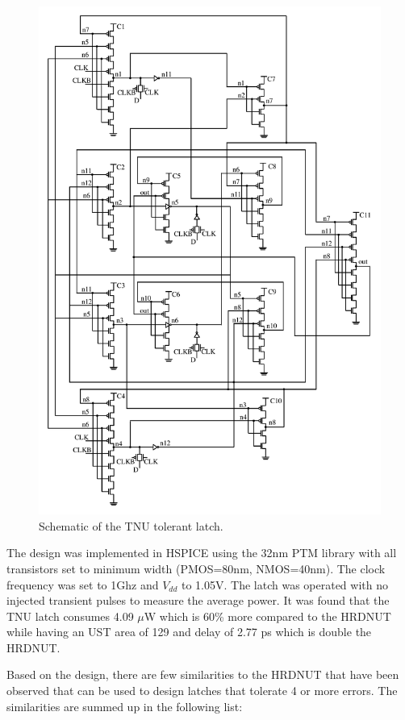 \begin{figure}[!htbp]
	\centering
	\includegraphics[width=0.90\linewidth]{Figures/TNULatch2}
	\caption{Schematic of the TNU tolerant latch.}
	\label{TNULatch}
\end{figure} 

The design was implemented in HSPICE using the 32nm PTM library with all transistors set to minimum width (PMOS=80nm, NMOS=40nm). The clock frequency was set to 1Ghz and $V_{dd}$ to 1.05V. The latch was operated with no injected transient pulses to measure the average power. It was found that the TNU latch consumes 4.09 $\mu$W which is 60\% more compared to the HRDNUT while having an UST area of 129 and delay of 2.77 ps which is double the HRDNUT. 

Based on the design, there are few similarities to the HRDNUT that have been observed that can be used to design latches that tolerate 4 or more errors. The similarities are summed up in the following list:

